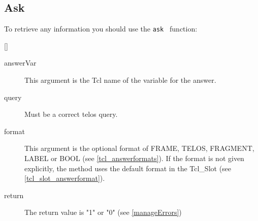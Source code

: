  \subsection{Ask}
	To retrieve any information you should use the {\tt ask } function: \\
	\begin{method}{   
			 [] 
		}
	  \begin{description}
	    \item[ answerVar]
		This argument is the Tcl name of the variable 
	 	for the answer.
	    \item[ query] Must be a correct telos query.
	    \item[ format] 
		This argument is the optional format of
	 	FRAME, TELOS, FRAGMENT, LABEL or BOOL
			(see \ref{tcl_answerformats}).
		If the format is not given explicitly, 
		the method uses the default format in the 
		Tcl\_Slot  
			(see \ref{tcl_slot_answerformat}).
	    \item[ return]
		The return value is "1" or "0" (see \ref{manageErrors})
	  \end{description}
	\end{method}
